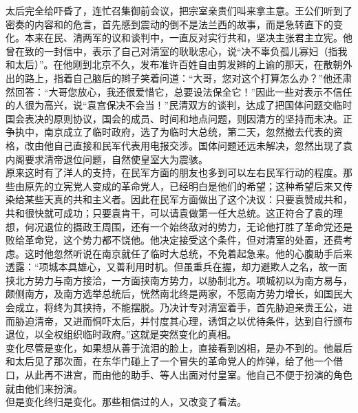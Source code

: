 太后完全给吓昏了，连忙召集御前会议，把宗室亲贵们叫来拿主意。王公们听到了密奏的内容和的危言，首先感到震动的倒不是法兰西的故事，而是急转直下的变化。本来在民、清两军的议和谈判中，一直反对实行共和，坚决主张君主立宪。他曾在致的一封信中，表示了自己对清室的耿耿忠心，说“决不辜负孤儿寡妇（指我和太后）”。在他刚到北京不久，发布准许百姓自由剪发辫的上谕的那天，在散朝外出的路上，指着自己脑后的辫子笑着问道：“大哥，您对这个打算怎么办？”他还肃然回答：“大哥您放心，我还很爱惜它，总要设法保全它！”因此一些对表示不信任的人很为高兴，说“袁宫保决不会当！”民清双方的谈判，达成了把国体问题交临时国会表决的原则协议，国会的成员、时间和地点问题，则因清方的坚持而未决。正争执中，南京成立了临时政府，选了为临时大总统，第二天，忽然撤去代表的资格，改由他自己直接和民军代表用电报交涉。国体问题还远未解决，忽然出现了袁内阁要求清帝退位问题，自然使皇室大为震骇。\\

原来这时有了洋人的支持，在民军方面的朋友也多到可以左右民军行动的程度。那些由原先的立宪党人变成的革命党人，已经明白是他们的希望；这种希望后来又传染给某些天真的共和主义者。因此在民军方面做出了这个决议：只要袁赞成共和，共和很快就可成功；只要袁肯干，可以请袁做第一任大总统。这正符合了袁的理想，何况退位的摄政王周围，还有一个始终敌对的势力，无论他打胜了革命党还是败给革命党，这个势力都不饶他。他决定接受这个条件，但对清室的处置，还费考虑。这时他忽然听说在南京就任了临时大总统，不免着起急来。他的心腹助手后来透露：“项城本具雄心，又善利用时机。但虽重兵在握，却力避欺人之名，故一面挟北方势力与南方接洽，一方面挟南方势力，以胁制北方。项城初以为南方易与，颇侧南方，及南方选举总统后，恍然南北终是两家，不愿南方势力增长，如国民大会成立，将终为其挟持，不能摆脱。乃决计专对清室着手，首先胁迫亲贵王公，进而胁迫清帝，又进而恫吓太后，并忖度其心理，诱饵之以优待条件，达到自行颁布退位，以全权组织临时政府。”这就是突然变化的真相。\\

变化尽管是变化，如果想从善于流泪的脸上，直接看到凶相，是办不到的。他最后和太后见了那次面，在东华门碰上了一个冒失的革命党人的炸弹，给了他一个借口，从此再不进宫，而由他的助手、等人出面对付皇室。他自己不便于扮演的角色就由他们来扮演。\\

但是变化终归是变化。那些相信过的人，又改变了看法。\\


